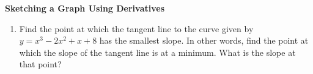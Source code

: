 \documentclass[11pt]{article}
\begin{document}

\centerline{\textbf{\Large{Sketching a Graph Using Derivatives}}}

\vspace{0.2in}
 
\begin{enumerate}
\item Find the point at which the tangent line to the curve given by $y = x^3 - 2x^2 + x + 8$ has the smallest slope. In other words, find the point at which the slope of the tangent line is at a minimum. What is the slope at that point? 

\end{enumerate}
\end{document}
